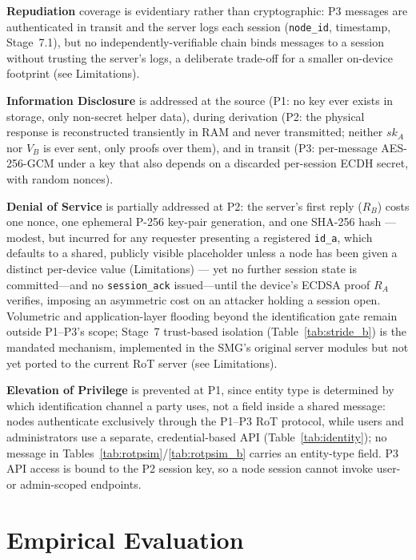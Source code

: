 \documentclass[preprint,12pt,authoryear]{elsarticle}
\begin{document}
\noindent\textbf{Repudiation} coverage is evidentiary rather than cryptographic: P3 messages are authenticated in transit and the server logs each session (\texttt{node\_id}, timestamp, Stage~7.1), but no independently-verifiable chain binds messages to a session without trusting the server's logs, a deliberate trade-off for a smaller on-device footprint (see Limitations).

\noindent\textbf{Information Disclosure} is addressed at the source (P1: no key ever exists in storage, only non-secret helper data), during derivation (P2: the physical response is reconstructed transiently in RAM and never transmitted; neither $sk_A$ nor $V_B$ is ever sent, only proofs over them), and in transit (P3: per-message AES-256-GCM under a key that also depends on a discarded per-session ECDH secret, with random nonces).

\noindent\textbf{Denial of Service} is partially addressed at P2: the server's first reply ($R_B$) costs one nonce, one ephemeral P-256 key-pair generation, and one SHA-256 hash --- modest, but incurred for any requester presenting a registered \texttt{id\_a}, which defaults to a shared, publicly visible placeholder unless a node has been given a distinct per-device value (Limitations) --- yet no further session state is committed---and no \texttt{session\_ack} issued---until the device's ECDSA proof $R_A$ verifies, imposing an asymmetric cost on an attacker holding a session open. Volumetric and application-layer flooding beyond the identification gate remain outside P1--P3's scope; Stage~7 trust-based isolation (Table~\ref{tab:stride_b}) is the mandated mechanism, implemented in the SMG's original server modules but not yet ported to the current RoT server (see Limitations).

\noindent\textbf{Elevation of Privilege} is prevented at P1, since entity type is determined by which identification channel a party uses, not a field inside a shared message: nodes authenticate exclusively through the P1--P3 RoT protocol, while users and administrators use a separate, credential-based API (Table~\ref{tab:identity}); no message in Tables~\ref{tab:rotpsim}/\ref{tab:rotpsim_b} carries an entity-type field. P3 API access is bound to the P2 session key, so a node session cannot invoke user- or admin-scoped endpoints.


\section{Empirical Evaluation}
\label{sec:evaluation}
\end{document}
